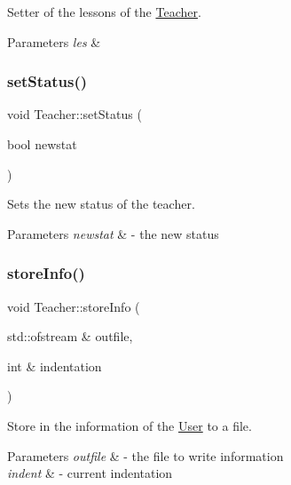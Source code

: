 Setter of the lessons of the \mbox{\hyperlink{class_teacher}{Teacher}}. 


\begin{DoxyParams}{Parameters}
{\em les} & \\
\hline
\end{DoxyParams}
\mbox{\label{class_teacher_a024a7daf22ee3ac310b69ba72fda5bb3}} 
\subsubsection{\texorpdfstring{set\+Status()}{setStatus()}}
{\footnotesize\ttfamily void Teacher\+::set\+Status (\begin{DoxyParamCaption}\item[{bool}]{newstat }\end{DoxyParamCaption})}



Sets the new status of the teacher. 


\begin{DoxyParams}{Parameters}
{\em newstat} & -\/ the new status \\
\hline
\end{DoxyParams}
\mbox{\label{class_teacher_a2ece0d60fa7ec4aaf93333aa0be0d25f}} 
\subsubsection{\texorpdfstring{store\+Info()}{storeInfo()}}
{\footnotesize\ttfamily void Teacher\+::store\+Info (\begin{DoxyParamCaption}\item[{std\+::ofstream \&}]{outfile,  }\item[{int \&}]{indentation }\end{DoxyParamCaption})\hspace{0.3cm}{\ttfamily [virtual]}}



Store in the information of the \mbox{\hyperlink{class_user}{User}} to a file. 


\begin{DoxyParams}{Parameters}
{\em outfile} & -\/ the file to write information \\
\hline
{\em indent} & -\/ current indentation \\
\hline
\end{DoxyParams}


